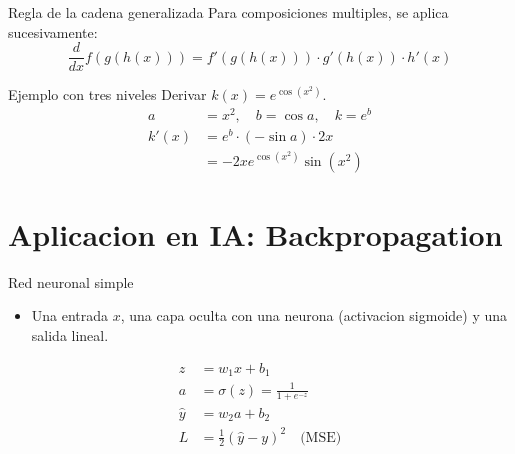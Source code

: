 \documentclass[aspectratio=169, 10pt, xcolor=table]{beamer}
\begin{document}
\begin{frame}{Regla de la cadena generalizada}
    Para composiciones multiples, se aplica sucesivamente:
    \[
    \frac{d}{dx}f(g(h(x))) = f'(g(h(x))) \cdot g'(h(x)) \cdot h'(x)
    \]
    \begin{exampleblock}{Ejemplo con tres niveles}
        Derivar $k(x)=e^{\cos(x^2)}$.
        \begin{align*}
            a &= x^2,\quad b=\cos a,\quad k=e^b \\
            k'(x) &= e^b \cdot (-\sin a) \cdot 2x \\
            &= -2x e^{\cos(x^2)} \sin(x^2)
        \end{align*}
    \end{exampleblock}
\end{frame}

\section{Aplicacion en IA: Backpropagation}

\begin{frame}{Red neuronal simple}
    \begin{itemize}
        \item Una entrada $x$, una capa oculta con una neurona (activacion sigmoide) y una salida lineal.
    \end{itemize}
    \begin{align*}
        z &= w_1 x + b_1 \\
        a &= \sigma(z) = \frac{1}{1+e^{-z}} \\
        \hat{y} &= w_2 a + b_2 \\
        L &= \frac{1}{2}(\hat{y}-y)^2 \quad\text{(MSE)}
    \end{align*}
    \begin{center}
    \end{center}
\end{frame}
\end{document}

